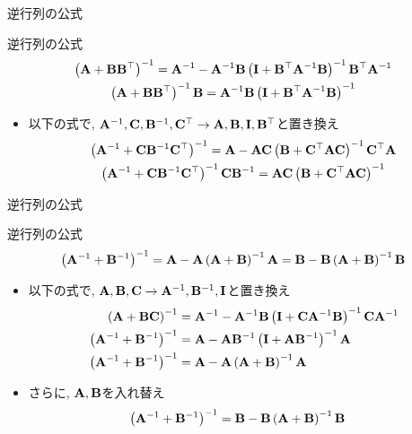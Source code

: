 \documentclass[dvipdfmx,notheorems,t]{beamer}
\begin{document}
\begin{frame}{逆行列の公式}
\begin{block}{逆行列の公式}
  \begin{gather*}
    \left( \vb{A} + \vb{B} \vb{B}^\top \right)^{-1}
      = \vb{A}^{-1} - \vb{A}^{-1} \vb{B}
        \left( \vb{I} + \vb{B}^\top \vb{A}^{-1} \vb{B} \right)^{-1} \vb{B}^\top \vb{A}^{-1} \\
    \left( \vb{A} + \vb{B} \vb{B}^\top \right)^{-1} \vb{B}
      = \vb{A}^{-1} \vb{B} \left( \vb{I} + \vb{B}^\top \vb{A}^{-1} \vb{B} \right)^{-1}
  \end{gather*}
\end{block}

\begin{itemize}
  \item 以下の式で, $\vb{A}^{-1}, \vb{C}, \vb{B}^{-1}, \vb{C}^\top \to \vb{A}, \vb{B}, \vb{I}, \vb{B}^\top$と置き換え
  \begin{gather*}
    \left( \vb{A}^{-1} + \vb{C} \vb{B}^{-1} \vb{C}^\top \right)^{-1}
      = \vb{A} - \vb{A} \vb{C}
        \left( \vb{B} + \vb{C}^\top \vb{A} \vb{C} \right)^{-1} \vb{C}^\top \vb{A} \\
    \left( \vb{A}^{-1} + \vb{C} \vb{B}^{-1} \vb{C}^\top \right)^{-1} \vb{C} \vb{B}^{-1}
      = \vb{A} \vb{C} \left( \vb{B} + \vb{C}^\top \vb{A} \vb{C} \right)^{-1}
  \end{gather*}
\end{itemize}
\end{frame}

\begin{frame}{逆行列の公式}
\begin{block}{逆行列の公式}
  $$\left( \vb{A}^{-1} + \vb{B}^{-1} \right)^{-1}
    = \vb{A} - \vb{A} \left( \vb{A} + \vb{B} \right)^{-1} \vb{A}
    = \vb{B} - \vb{B} \left( \vb{A} + \vb{B} \right)^{-1} \vb{B}$$
\end{block}

\begin{itemize}
  \item 以下の式で, $\vb{A}, \vb{B}, \vb{C} \to \vb{A}^{-1}, \vb{B}^{-1}, \vb{I}$と置き換え
  \begin{align*}
    \left( \vb{A} + \vb{B} \vb{C} \right)^{-1}
      &= \vb{A}^{-1} - \vb{A}^{-1} \vb{B}
        \left( \vb{I} + \vb{C} \vb{A}^{-1} \vb{B} \right)^{-1} \vb{C} \vb{A}^{-1} \\
    \left( \vb{A}^{-1} + \vb{B}^{-1} \right)^{-1}
      &= \vb{A} - \vb{A} \vb{B}^{-1} \left( \vb{I} + \vb{A} \vb{B}^{-1} \right)^{-1} \vb{A} \\
    \left( \vb{A}^{-1} + \vb{B}^{-1} \right)^{-1}
      &= \vb{A} - \vb{A} \left( \vb{A} + \vb{B} \right)^{-1} \vb{A}
  \end{align*}
  \item さらに, $\vb{A}, \vb{B}$を入れ替え
  \begin{align*}
    \left( \vb{A}^{-1} + \vb{B}^{-1} \right)^{-1}
      &= \vb{B} - \vb{B} \left( \vb{A} + \vb{B} \right)^{-1} \vb{B}
  \end{align*}
\end{itemize}
\end{frame}
\end{document}
